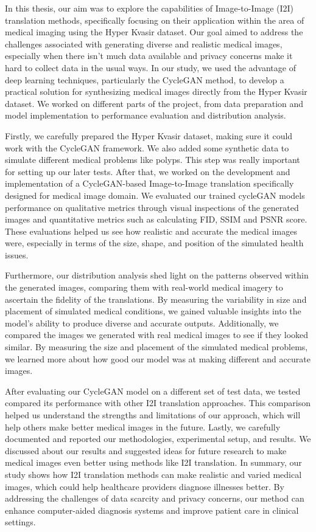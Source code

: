 \documentclass[UKenglish,12pt]{master-style}
\begin{document}
In this thesis, our aim was to explore the capabilities of Image-to-Image (I2I) translation methods, specifically focusing on their application within the area of medical imaging using the Hyper Kvasir dataset. Our goal aimed to address the challenges associated with generating diverse and realistic medical images, especially when there isn't much data available and privacy concerns make it hard to collect data in the usual ways. In our study, we used the advantage of deep learning techniques, particularly the CycleGAN method, to develop a practical solution for synthesizing medical images directly from the Hyper Kvasir dataset. We worked on different parts of the project, from data preparation and model implementation to performance evaluation and distribution analysis.

Firstly, we carefully prepared the Hyper Kvasir dataset, making sure it could work with the CycleGAN framework. We also added some synthetic data to simulate different medical problems like polyps. This step was really important for setting up our later tests. After that, we worked on the development and implementation of a CycleGAN-based Image-to-Image translation specifically designed for medical image domain. We evaluated our trained cycleGAN models performance on qualitative metrics through visual inspections of the generated images and quantitative metrics such as calculating FID, SSIM and PSNR score. These evaluations helped us see how realistic and accurate the medical images were, especially in terms of the size, shape, and position of the simulated health issues.

Furthermore, our distribution analysis shed light on the patterns observed within the generated images, comparing them with real-world medical imagery to ascertain the fidelity of the translations. By measuring the variability in size and placement of simulated medical conditions, we gained valuable insights into the model's ability to produce diverse and accurate outputs. Additionally, we compared the images we generated with real medical images to see if they looked similar. By measuring the size and placement of the simulated medical problems, we learned more about how good our model was at making different and accurate images.

After evaluating our CycleGAN model on a different set of test data, we tested compared its performance with other I2I translation approaches. This comparison helped us understand the strengths and limitations of our approach, which will help others make better medical images in the future. Lastly, we carefully documented and reported our methodologies, experimental setup, and results. We discussed about our results and suggested ideas for future research to make medical images even better using methods like I2I translation. In summary, our study shows how I2I translation methods can make realistic and varied medical images, which could help healthcare providers diagnose illnesses better. By addressing the challenges of data scarcity and privacy concerns, our method can enhance computer-aided diagnosis systems and improve patient care in clinical settings.
\end{document}
